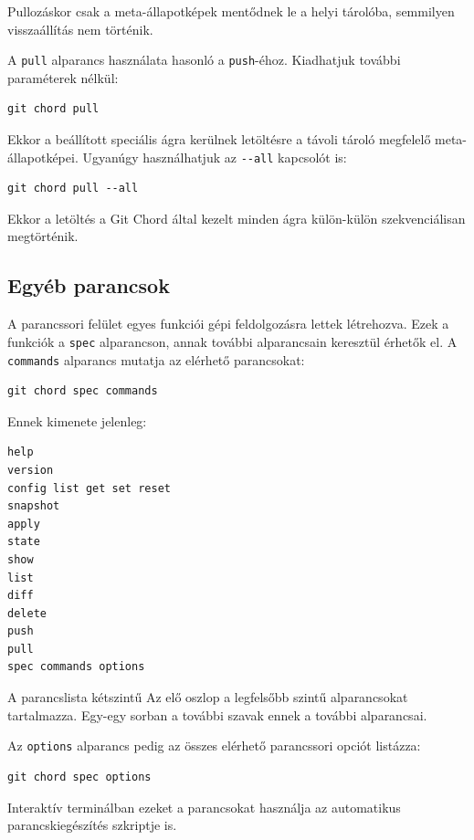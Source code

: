 \documentclass[
]{elteikthesis}[2025/03/25]
\begin{document}
Pullozáskor csak a meta-állapotképek mentődnek le a helyi tárolóba,
semmilyen visszaállítás nem történik.

A \verb|pull| alparancs használata hasonló a \verb|push|-éhoz.
Kiadhatjuk további paraméterek nélkül:

\begin{verbatim}
git chord pull
\end{verbatim}

Ekkor a beállított speciális ágra kerülnek letöltésre a távoli tároló megfelelő meta-állapotképei.
Ugyanúgy használhatjuk az \verb|--all| kapcsolót is:

\begin{verbatim}
git chord pull --all
\end{verbatim}

Ekkor a letöltés a Git Chord által kezelt minden ágra külön-külön szekvenciálisan megtörténik.

\subsection{Egyéb parancsok}

A parancssori felület egyes funkciói gépi feldolgozásra lettek létrehozva.
Ezek a funkciók a \verb|spec| alparancson, annak további alparancsain keresztül érhetők el.
A \verb|commands| alparancs mutatja az elérhető parancsokat:

\begin{verbatim}
git chord spec commands
\end{verbatim}

Ennek kimenete jelenleg:

\begin{verbatim}
help
version
config list get set reset
snapshot
apply
state
show
list
diff
delete
push
pull
spec commands options
\end{verbatim}

A parancslista kétszintű
Az elő oszlop a legfelsőbb szintű alparancsokat tartalmazza.
Egy-egy sorban a további szavak ennek a további alparancsai.

Az \verb|options| alparancs pedig az összes elérhető parancssori opciót listázza:

\begin{verbatim}
git chord spec options
\end{verbatim}

Interaktív terminálban ezeket a parancsokat használja az automatikus parancskiegészítés szkriptje is.
\end{document}
